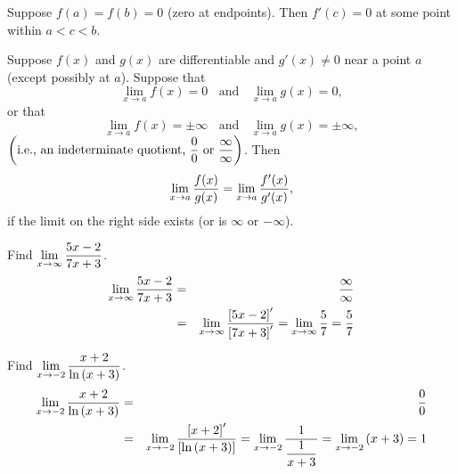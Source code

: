 \begin{theorem}
   Suppose $f(a) = f(b) = 0$ (zero at endpoints). Then $f'(c) = 0$ at some point within $a<c<b$.
\end{theorem}

\begin{theorem}
   Suppose $f(x)$ and $g(x)$ are differentiable and $g'(x)\neq 0$ near a point $a$ (except possibly at $a$). Suppose that
    \begin{displaymath}
      \lim_{x\rightarrow a} f(x) = 0 \;\;\text{ and }\;\; \lim_{x\rightarrow a} g(x) = 0,
    \end{displaymath}
or that
    \begin{displaymath}
      \lim_{x\rightarrow a} f(x) = \pm\infty \;\;\text{ and }\;\; \lim_{x\rightarrow a} g(x) = \pm\infty,
    \end{displaymath}
$\left(\text{i.e., an indeterminate quotient, }\displaystyle\frac{0}{0} \text{ or }\displaystyle\frac{\infty}{\infty}\right)$. Then
    \begin{equation}
        \lim_{x\rightarrow a}\displaystyle\frac{f(x)}{g(x)} = \lim_{x\rightarrow a}\displaystyle\frac{f'(x)}{g'(x)},
    \end{equation}
if the limit on the right side exists (or is $\infty$ or $-\infty$).
    \begin{list}{\bf Example :~}{}
%       
       \item Find $\lim\limits_{x\rightarrow\infty} \displaystyle\frac{5x-2}{7x+3}$.
           \begin{eqnarray}
              \lim_{x\rightarrow\infty}\displaystyle\frac{5x-2}{7x+3} &=& \displaystyle\frac{\infty}{\infty} \nonumber \\
                                                   &=& \lim_{x\rightarrow\infty}\displaystyle\frac{\left[5x-2\right]'}{\left[7x+3\right]'} = \lim_{x\rightarrow\infty} \displaystyle\frac{5}{7} = \displaystyle\frac{5}{7}\nonumber
           \end{eqnarray}
%
      \item Find $\lim\limits_{x\rightarrow -2}\displaystyle\frac{x+2}{\ln{(x+3)}}$. 
           \begin{eqnarray}
              \lim_{x\rightarrow -2}\displaystyle\frac{x+2}{\ln{(x+3)}} &=& \displaystyle\frac{0}{0} \nonumber \\                                                   &=& \lim_{x\rightarrow -2}\displaystyle\frac{\left[x+2\right]'}{\left[\ln{(x+3)}\right]} = \lim_{x\rightarrow -2} \displaystyle\frac{1}{\displaystyle\frac{1}{x+3}} = \lim_{x\rightarrow -2} \left(x+3\right) = 1 \nonumber
           \end{eqnarray}
         
%
    \end{list}


\end{theorem}

